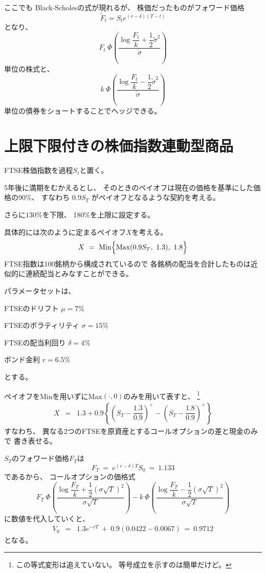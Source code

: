 \documentclass[uplatex,a4j,12pt,dvipdfmx]{jsarticle}
\begin{document}
ここでも
Black-Scholesの式が現れるが、
株価だったものがフォワード価格
$$
	\tilde{F}_{t}=S_{t} e^{(r - \delta)(T-t)}
$$
となり、
$$
	F_{t}
	\ \! \Phi
	\left(
	\dfrac{
		\log \dfrac{F_{t}}{k} + \dfrac{1}{2} \tilde{\sigma}^{2}
	}
	{\tilde{\sigma}}
	\right)
$$
単位の株式と、
$$
	k
	\ \! \Phi
	\left(
	\dfrac{
		\log \dfrac{F_{t}}{k} - \dfrac{1}{2} \tilde{\sigma}^{2}
	}
	{\tilde{\sigma}}
	\right)
$$
単位の債券をショートすることでヘッジできる。
\section{上限下限付きの株価指数連動型商品}

FTSE株価指数を過程$S_{t}$と置く。

5年後に満期をむかえるとし、
そのときのペイオフは現在の価格を基準にした価格の90$\%$、
すなわち
$0.9S_{T}$
がペイオフとなるような契約を考える。

さらに$130\%$を下限、
180$\%$を上限に設定する。

具体的には次のように定まるペイオフ$X$を考える。
$$
	X
	\ = \
	{\rm Min}
	\Big\{
	{\rm Max}
	( 0.9 S_{T} , \ 1.3 ) , \ 1.8
	\Big\}
$$
FTSE指数は100銘柄から構成されているので
各銘柄の配当を合計したものは近似的に連続配当とみなすことができる。

パラメータセットは、

FTSEのドリフト $\mu = 7 \%$

FTSEのボラティリティ $\sigma = 15 \%$

FTSEの配当利回り $\delta = 4 \%$

ポンド金利 $r = 6.5 \%$

とする。

ペイオフをMinを用いずにMax$( \cdot , 0)$のみを用いて表すと、
\footnote{この等式変形は追えていない。
	等号成立を示すのは簡単だけど。
}
%
%
\begin{eqnarray*}
	X
	&=&
	1.3
	+
	0.9
	\left\{
	\left( S_{T} - \dfrac{1.3}{0.9} \right)^{+}
	-
	\left( S_{T} - \dfrac{1.8}{0.9} \right)^{+}
	\right\}
\end{eqnarray*}
%
%
すなわち、
異なる2つのFTSEを原資産とするコールオプションの差と現金のみで
書き表せる。

$S_{T}$のフォワード価格$F_{T}$は
$$
	F_{T}
	\ = \
	e^{(r-\delta)T}S_{0}
	\ = \
	1.133
$$
であるから、
コールオプションの価格式
$$
	F_{T}
	\ \! \Phi
	\left(
	\dfrac{
		\log \dfrac{F_{T}}{k} + \dfrac{1}{2} ( \sigma \sqrt{T} )^{2}
	}
	{\sigma \sqrt{T}}
	\right)
	-
	k
	\ \! \Phi
	\left(
	\dfrac{
		\log \dfrac{F_{T}}{k} - \dfrac{1}{2} ( \sigma \sqrt{T} )^{2}
	}
	{\sigma \sqrt{T}}
	\right)
$$
に数値を代入していくと、
%
%
\begin{eqnarray*}
	V_{0}
	&=&
	1.3 e^{-rT}
	\ + \
	0.9
	(0.0422 - 0.0067)
	\ = \
	0.9712
\end{eqnarray*}
%
%
となる。
\end{document}
